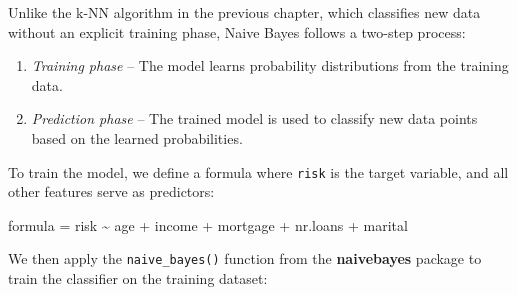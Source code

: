 \documentclass[
  11pt,
]{book}
\makeatletter
\newenvironment{Shaded}{}{}
\newcommand{\NormalTok}[1]{#1}
\newcommand{\OtherTok}[1]{\textcolor[rgb]{0.39,0.39,0.39}{#1}}
\newcommand{\SpecialCharTok}[1]{\textcolor[rgb]{0.39,0.39,0.39}{#1}}
\providecommand{\tightlist}{%
  \setlength{\itemsep}{0pt}\setlength{\parskip}{0pt}}
\newenvironment{kframe}{%
\medskip{}
\setlength{\fboxsep}{.8em}
 \def\at@end@of@kframe{}%
 \ifinner\ifhmode%
  \def\at@end@of@kframe{\end{minipage}}%
  \begin{minipage}{\columnwidth}%
 \fi\fi%
 \def\FrameCommand##1{\hskip\@totalleftmargin \hskip-\fboxsep
 \colorbox{shadecolor}{##1}\hskip-\fboxsep
     \hskip-\linewidth \hskip-\@totalleftmargin \hskip\columnwidth}%
 \MakeFramed {\advance\hsize-\width
   \@totalleftmargin\z@ \linewidth\hsize
   \@setminipage}}%
 {\par\unskip\endMakeFramed%
 \at@end@of@kframe}
\renewenvironment{Shaded}{\begin{kframe}}{\end{kframe}}
\theoremstyle{definition}
\theoremstyle{definition}
\theoremstyle{definition}
\theoremstyle{definition}
\theoremstyle{remark}
\makeatother
\begin{document}
Unlike the k-NN algorithm in the previous chapter, which classifies new data without an explicit training phase, Naive Bayes follows a two-step process:

\begin{enumerate}
\def\labelenumi{\arabic{enumi}.}
\tightlist
\item
  \emph{Training phase} -- The model learns probability distributions from the training data.\\
\item
  \emph{Prediction phase} -- The trained model is used to classify new data points based on the learned probabilities.
\end{enumerate}

To train the model, we define a formula where \texttt{risk} is the target variable, and all other features serve as predictors:

\begin{Shaded}
\begin{Highlighting}[]
\NormalTok{formula }\OtherTok{=}\NormalTok{ risk }\SpecialCharTok{\textasciitilde{}}\NormalTok{ age }\SpecialCharTok{+}\NormalTok{ income }\SpecialCharTok{+}\NormalTok{ mortgage }\SpecialCharTok{+}\NormalTok{ nr.loans }\SpecialCharTok{+}\NormalTok{ marital}
\end{Highlighting}
\end{Shaded}

We then apply the \texttt{naive\_bayes()} function from the \textbf{naivebayes} package to train the classifier on the training dataset:
\end{document}
